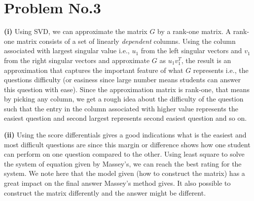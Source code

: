 \section*{Problem No.3} \label{sec:prob3}

\textbf{(i)} Using SVD, we can approximate the matrix $G$ by a rank-one matrix. A rank-one matrix consists of a set of linearly \emph{dependent} columns. Using the column associated with largest singular value i.e., $u_{1}$ from the left singular vectors and $v_{1}$ from the right singular vectors and approximate $G$ as $u_{1}v_{1}^{T}$, the result is an approximation that captures the important feature of what $G$ represents i.e., the questions difficulty (or easiness since large number means students can answer this question with ease). Since the approximation matrix is rank-one, that means by picking any column, we get a rough idea about the difficulty of the question such that the entry in the column associated with higher value represents the easiest question and second largest represents second easiest question and so on. 

\textbf{(ii)} 
Using the score differentials gives a good indications what is the easiest and most difficult questions are since this margin or difference shows how one student can perform on one question compared to the other. Using least square to solve the system of equation given by Massey's, we can reach the best rating for the system. We note here that the model given (how to construct the matrix) has a great impact on the final answer Massey's method gives. It also possible to construct the matrix differently and the answer might be different. 



